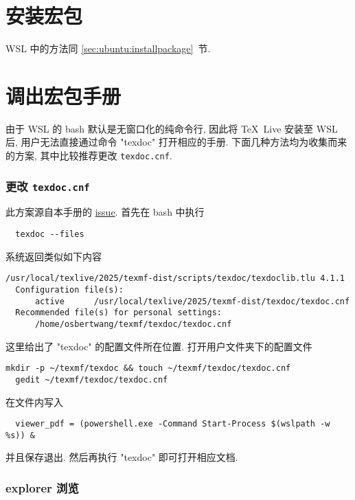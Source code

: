 \section{安装宏包}

WSL 中的方法同 \ref{sec:ubuntu:installpackage}~节.

\section{调出宏包手册}

由于 WSL 的 \textsf{bash} 默认是无窗口化的纯命令行,
因此将 \TeX\ Live 安装至 WSL 后,
用户无法直接通过命令 "texdoc" 打开相应的手册.
下面几种方法均为收集而来的方案,
其中比较推荐更改 \texttt{texdoc.cnf}.

\subsubsection{更改 \texttt{texdoc.cnf}}

此方案源自本手册的 \href{https://github.com/OsbertWang/install-latex-guide-zh-cn/issues/13}{issue}.
首先在 \textsf{bash} 中执行
\begin{lstlisting}
  texdoc --files
\end{lstlisting}
系统返回类似如下内容
\begin{lstlisting}[language = {}]
  /usr/local/texlive/2025/texmf-dist/scripts/texdoc/texdoclib.tlu 4.1.1
  Configuration file(s):
      active      /usr/local/texlive/2025/texmf-dist/texdoc/texdoc.cnf
  Recommended file(s) for personal settings:
      /home/osbertwang/texmf/texdoc/texdoc.cnf
\end{lstlisting}
这里给出了 "texdoc" 的配置文件所在位置.
打开用户文件夹下的配置文件
\begin{lstlisting}[deletekeywords = texdoc]
  mkdir -p ~/texmf/texdoc && touch ~/texmf/texdoc/texdoc.cnf
  gedit ~/texmf/texdoc/texdoc.cnf
\end{lstlisting}
在文件内写入
\begin{lstlisting}
  viewer_pdf = (powershell.exe -Command Start-Process $(wslpath -w %s)) &
\end{lstlisting}
并且保存退出.
然后再执行 "texdoc" 即可打开相应文档.

\subsubsection{explorer 浏览}

